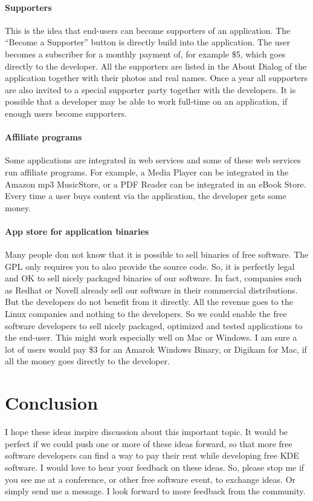 \paragraph*{Supporters}

This is the idea that end-users can become supporters of an application. The ``Become a Supporter'' button is directly build into the application. The user becomes a subscriber for a monthly payment of, for example \$5, which goes directly to the developer. All the supporters are listed in the About Dialog of the application together with their photos and real names. Once a year all supporters are also invited to a special supporter party together with the developers. It is possible that a developer may be able to work full-time on an application, if enough users become supporters.

\paragraph*{Affiliate programs}

Some applications are integrated in web services and some of these web services run affiliate programs. For example, a Media Player can be integrated in the Amazon mp3 MusicStore, or a PDF Reader can be integrated in an eBook Store. Every time a user buys content via the application, the developer gets some money.

\paragraph*{App store for application binaries}

Many people don not know that it is possible to sell binaries of free software. The GPL only requires you to also provide the source code. So, it is perfectly legal and OK to sell nicely packaged binaries of our software. In fact, companies such as Redhat or Novell already sell our software in their commercial distributions. But the developers do not benefit from it directly. All the revenue goes to the Linux companies and nothing to the developers. So we could enable the free software developers to sell nicely packaged, optimized and tested applications to the end-user. This might work especially well on Mac or Windows. I am sure a lot of users would pay \$3 for an Amarok Windows Binary, or Digikam for Mac, if all the money goes directly to the developer.

\section*{Conclusion}
I hope  these ideas inspire discussion about this important topic. It would be perfect if we could push one or more of these ideas forward, so that more free software developers can find a way to pay their rent while developing free KDE software.
I would love to hear your feedback on these ideas. So, please stop me if you see me at a conference, or other free software event, to exchange ideas. Or simply send me a message. I look forward to more feedback from the community.
